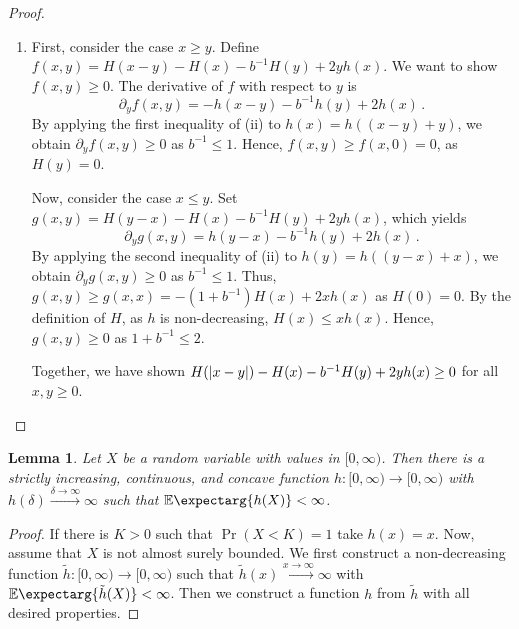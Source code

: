 \documentclass{scrartcl}
\newcommand{\Prof}[1]{\Pr(#1)}
\newcommand{\Ex}{\E\expectarg}
\newcommand{\equationFullstop}{\, .}
\newcommand{\eqfs}{\equationFullstop}
\theoremstyle{plain}\newtheorem{theorem}{Theorem}[section]
\newtheorem{lemma}[theorem]{Lemma}
\theoremstyle{definition}
\theoremstyle{remark}
\providecommand{\DIFaddtex}[1]{{\protect\color{blue}\uwave{#1}}} %
\providecommand{\DIFdeltex}[1]{{\protect\color{red}\sout{#1}}}                      %
\providecommand{\DIFaddbegin}{} %
\providecommand{\DIFaddend}{} %
\providecommand{\DIFdelbegin}{} %
\providecommand{\DIFdelend}{} %
\providecommand{\DIFadd}[1]{\texorpdfstring{\DIFaddtex{#1}}{#1}} %
\providecommand{\DIFdel}[1]{\texorpdfstring{\DIFdeltex{#1}}{}} %
\newcommand{\DIFscaledelfig}{0.5}
\newlength{\DIFdelgraphicswidth} %
\newlength{\DIFdelgraphicsheight} %
\newcommand{\DIFaddincludegraphics}[2][]{{\color{blue}\fbox{\DIFOincludegraphics[#1]{#2}}}} %
\newcommand{\DIFdelincludegraphics}[2][]{%
\sbox{\DIFdelgraphicsbox}{\DIFOincludegraphics[#1]{#2}}%
\settoboxwidth{\DIFdelgraphicswidth}{\DIFdelgraphicsbox} %
\settoboxtotalheight{\DIFdelgraphicsheight}{\DIFdelgraphicsbox} %
\scalebox{\DIFscaledelfig}{%
\parbox[b]{\DIFdelgraphicswidth}{\usebox{\DIFdelgraphicsbox}\\[-\baselineskip] \rule{\DIFdelgraphicswidth}{0em}}\llap{\resizebox{\DIFdelgraphicswidth}{\DIFdelgraphicsheight}{%
\setlength{\unitlength}{\DIFdelgraphicswidth}%
\begin{picture}(1,1)%
\thicklines\linethickness{2pt} %
{\color[rgb]{1,0,0}\put(0,0){\framebox(1,1){}}}%
{\color[rgb]{1,0,0}\put(0,0){\line( 1,1){1}}}%
{\color[rgb]{1,0,0}\put(0,1){\line(1,-1){1}}}%
\end{picture}%
}\hspace*{3pt}}} %
} %
\DeclareRobustCommand{\DIFaddbegin}{\DIFOaddbegin \let\includegraphics\DIFaddincludegraphics} %
\DeclareRobustCommand{\DIFaddend}{\DIFOaddend \let\includegraphics\DIFOincludegraphics} %
\DeclareRobustCommand{\DIFdelbegin}{\DIFOdelbegin \let\includegraphics\DIFdelincludegraphics} %
\DeclareRobustCommand{\DIFdelend}{\DIFOaddend \let\includegraphics\DIFOincludegraphics} %
\begin{document}
\begin{appendix}
\begin{proof}
\begin{enumerate}[label=(\roman*)]
	By the definition of $b$ and with $\frac{1}{2}(u+v) \leq \max(u,v) \leq u+v$ for $u,v \geq 0$ the claim follows.
\item 
	First, consider the case $x\geq y$.
 	Define $f(x,y) = H(x-y)-H(x)- b^{-1} H(y) + 2 y h(x)$.
 	We want to show $f(x, y)\geq0$.
	The derivative of $f$ with respect to $y$ is 
	\begin{equation*}
		\partial_y f(x, y) = -h(x-y) - b^{-1}h(y) + 2 h(x)\eqfs
	\end{equation*} 
	By applying the first inequality of (ii) to $h(x) = h((x-y) + y)$, we obtain $\partial_y f(x, y)  \geq 0$ as $b^{-1} \leq 1$.
	Hence, $f(x, y) \geq f(x, 0) = 0$, as \DIFdelbegin \DIFdel{$H(y) = 0$}\DIFdelend \DIFaddbegin \DIFadd{$H(0) = 0$}\DIFaddend .

	Now, consider the case $x \leq y$. Set $g(x,y) = H(y-x) - H(x) - b^{-1} H(y) + 2 y h(x)$, which yields
	\begin{equation*}
		\partial_y g(x, y) = h(y-x) - b^{-1} h(y) + 2 h(x)\eqfs
	\end{equation*} 
	By applying the second inequality of (ii) to $h(y) = h((y-x) + x)$, we obtain $\partial_y g(x, y)  \geq 0$ as $b^{-1} \leq 1$.
	Thus, $g(x, y) \geq g(x, x) = -(1 + b^{-1}) H(x) + 2 x h(x)$ as $H(0) = 0$.
	By the definition of $H$, as $h$ is non-decreasing, $H(x) \leq x h(x)$. Hence, $g(x, y) \geq 0$ as $1 + b^{-1} \leq 2$.

	Together, we have shown $H(\left| x-y \right|) - H(x) - b^{-1} H(y) + 2 y h(x) \geq 0$ for all $x,y\geq0$.
\end{enumerate}
\end{proof}
\begin{lemma}\label{lmm:nondec:existence}
	Let $X$ be a random variable with values in $[0,\infty)$. Then there is a strictly increasing, continuous, and concave function $h \colon [0,\infty) \to [0,\infty)$ with $h(\delta)\xrightarrow{\delta\to\infty}\infty$ such that $\Ex{h(X)} < \infty$.
\end{lemma}
\begin{proof}
	If there is $K > 0$ such that $\Prof{X < K} = 1$ take $h(x) = x$. Now, assume that $X$ is not almost surely bounded.
	We first construct a non-decreasing function $\tilde h \colon [0,\infty) \to [0,\infty)$ such that $\tilde h (x) \xrightarrow{x\to\infty}\infty$ with $\Ex{\tilde h(X)} < \infty$.
	Then we construct a function $h$ from $\tilde h$ with all desired properties.


\end{proof}
\end{appendix}
\end{document}
